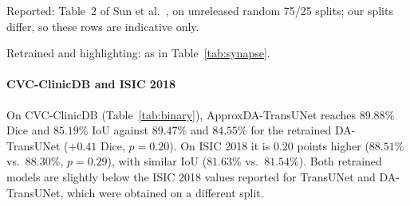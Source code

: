 \begin{table}[t]
\centering
\caption{Results on CVC-ClinicDB and ISIC 2018.}
\label{tab:binary}
\begin{tablenotes}
\item Reported: Table~2 of Sun et al.~\cite{sun2024datransunet}, on unreleased random 75/25 splits; our splits differ, so these rows are indicative only.
\item Retrained and highlighting: as in Table~\ref{tab:synapse}.
\end{tablenotes}
\end{table}

\paragraph{CVC-ClinicDB and ISIC 2018} On CVC-ClinicDB (Table~\ref{tab:binary}), ApproxDA-TransUNet reaches $89.88\%$ Dice and $85.19\%$ IoU against $89.47\%$ and $84.55\%$ for the retrained DA-TransUNet ($+0.41$ Dice, $p = 0.20$). On ISIC 2018 it is $0.20$ points higher ($88.51\%$ vs.\ $88.30\%$, $p = 0.29$), with similar IoU ($81.63\%$ vs.\ $81.54\%$). Both retrained models are slightly below the ISIC 2018 values reported for TransUNet and DA-TransUNet, which were obtained on a different split.

